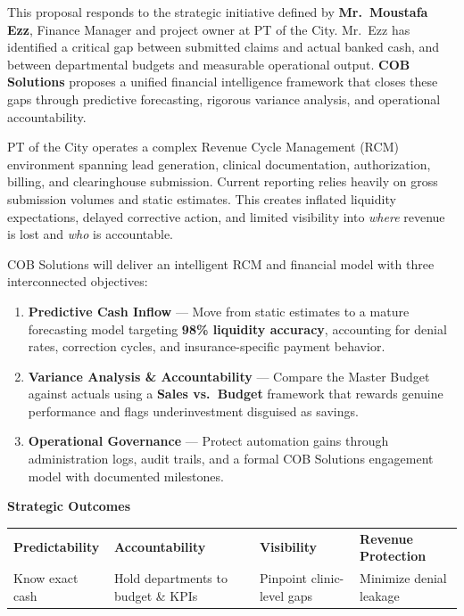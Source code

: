 \documentclass[11pt,a4paper]{article}
\begin{document}
This proposal responds to the strategic initiative defined by \textbf{Mr.\ Moustafa Ezz},
Finance Manager and project owner at PT of the City. Mr.\ Ezz has identified a critical
gap between submitted claims and actual banked cash, and between departmental budgets
and measurable operational output. \textbf{COB Solutions} proposes a unified financial
intelligence framework that closes these gaps through predictive forecasting, rigorous
variance analysis, and operational accountability.

PT of the City operates a complex Revenue Cycle Management (RCM) environment spanning
lead generation, clinical documentation, authorization, billing, and clearinghouse
submission. Current reporting relies heavily on gross submission volumes and static
estimates. This creates inflated liquidity expectations, delayed corrective action, and
limited visibility into \emph{where} revenue is lost and \emph{who} is accountable.

COB Solutions will deliver an intelligent RCM and financial model with three interconnected
objectives:

\begin{enumerate}
  \item \textbf{Predictive Cash Inflow} --- Move from static estimates to a mature forecasting
        model targeting \textbf{98\% liquidity accuracy}, accounting for denial rates,
        correction cycles, and insurance-specific payment behavior.
  \item \textbf{Variance Analysis \& Accountability} --- Compare the Master Budget against
        actuals using a \textbf{Sales vs.\ Budget} framework
        that rewards genuine performance and flags underinvestment disguised as savings.
  \item \textbf{Operational Governance} --- Protect automation gains through administration
        logs, audit trails, and a formal COB Solutions engagement model with documented
        milestones.
\end{enumerate}

\begin{tcolorbox}[statbox]
\begin{center}
  \Large\bfseries\color{PrimaryBlue}Strategic Outcomes\\[0.5em]
\end{center}
\vspace{0.2em}
\begin{center}
\begin{tabularx}{0.96\linewidth}{C{3.0cm} C{3.0cm} C{3.0cm} C{3.0cm}}
  \textcolor{PrimaryBlue}{\bfseries Predictability} &
  \textcolor{AccentTeal}{\bfseries Accountability} &
  \textcolor{AccentGold}{\bfseries Visibility} &
  \textcolor{SuccessGreen}{\bfseries Revenue Protection} \\[0.3em]
  \small Know exact cash &
  \small Hold departments to budget \& KPIs &
  \small Pinpoint clinic-level gaps &
  \small Minimize denial leakage \\
\end{tabularx}
\end{center}
\end{tcolorbox}
\end{document}
